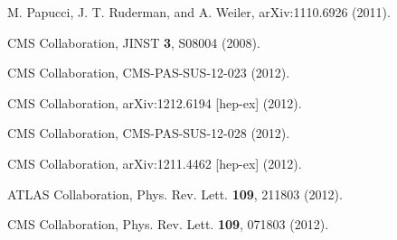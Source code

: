 \documentclass[epj,twocolumn]{webofc}
\begin{document}
%
% 
%
%
\begin{thebibliography}{}
%
%

M. Papucci, J. T. Ruderman, and A. Weiler, arXiv:1110.6926 (2011).

CMS Collaboration, JINST \textbf{3}, S08004 (2008).

CMS Collaboration, CMS-PAS-SUS-12-023 (2012).

CMS Collaboration, arXiv:1212.6194 [hep-ex] (2012).

CMS Collaboration, CMS-PAS-SUS-12-028 (2012).

CMS Collaboration, arXiv:1211.4462 [hep-ex] (2012).

ATLAS Collaboration, Phys. Rev. Lett. \textbf{109}, 211803 (2012).

CMS Collaboration, Phys. Rev. Lett. \textbf{109}, 071803 (2012).

\end{thebibliography}
\end{document}
